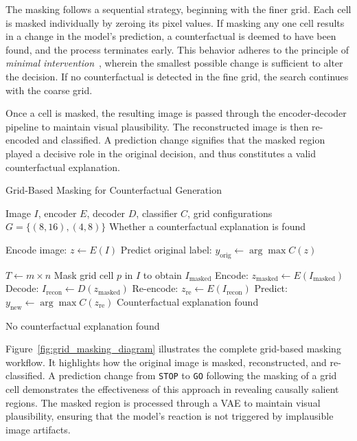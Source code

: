 The masking follows a sequential strategy, beginning with the finer grid. Each cell is masked individually by zeroing its pixel values. If masking any one cell results in a change in the model’s prediction, a counterfactual is deemed to have been found, and the process terminates early. This behavior adheres to the principle of \textit{minimal intervention}~\cite{wachter2018CE}, wherein the smallest possible change is sufficient to alter the decision. If no counterfactual is detected in the fine grid, the search continues with the coarse grid.

Once a cell is masked, the resulting image is passed through the encoder-decoder pipeline to maintain visual plausibility. The reconstructed image is then re-encoded and classified. A prediction change signifies that the masked region played a decisive role in the original decision, and thus constitutes a valid counterfactual explanation.


\vspace{1em}
\begin{algorithm}[htbp]
\caption{Grid-Based Masking for Counterfactual Generation}
\label{alg:grid_based_masking}
\begin{algorithmic}[1]
\REQUIRE Image $I$, encoder $E$, decoder $D$, classifier $C$, grid configurations $G = \{(8,16), (4,8)\}$
\ENSURE Whether a counterfactual explanation is found

\STATE Encode image: $z \leftarrow E(I)$
\STATE Predict original label: $y_{\text{orig}} \leftarrow \arg\max C(z)$

    \STATE $T \leftarrow m \times n$
        \STATE Mask grid cell $p$ in $I$ to obtain $I_{\text{masked}}$
        \STATE Encode: $z_{\text{masked}} \leftarrow E(I_{\text{masked}})$
        \STATE Decode: $I_{\text{recon}} \leftarrow D(z_{\text{masked}})$
        \STATE Re-encode: $z_{\text{re}} \leftarrow E(I_{\text{recon}})$
        \STATE Predict: $y_{\text{new}} \leftarrow \arg\max C(z_{\text{re}})$
            \RETURN Counterfactual explanation found
        \ENDIF
    \ENDFOR
\ENDFOR

\RETURN No counterfactual explanation found
\end{algorithmic}
\end{algorithm}
\vspace{1em}




Figure~\ref{fig:grid_masking_diagram} illustrates the complete grid-based masking workflow. It highlights how the original image is masked, reconstructed, and re-classified. A prediction change from \texttt{STOP} to \texttt{GO} following the masking of a grid cell demonstrates the effectiveness of this approach in revealing causally salient regions. The masked region is processed through a VAE to maintain visual plausibility, ensuring that the model’s reaction is not triggered by implausible image artifacts.

